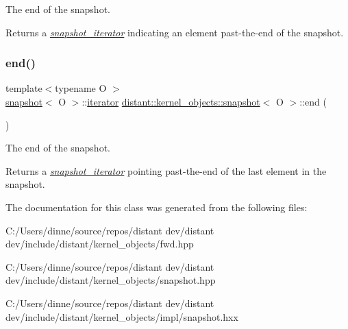 The end of the snapshot. 

\begin{DoxyReturn}{Returns}
a {\itshape \mbox{\hyperlink{classdistant_1_1kernel__objects_1_1snapshot__iterator}{snapshot\+\_\+iterator}}} indicating an element past-\/the-\/end of the snapshot. 
\end{DoxyReturn}
\mbox{\label{classdistant_1_1kernel__objects_1_1snapshot_a0ab636ba02b2ec13644a02b00317c4bb}} 
\subsubsection{\texorpdfstring{end()}{end()}\hspace{0.1cm}{\footnotesize\ttfamily [2/2]}}
{\footnotesize\ttfamily template$<$typename O $>$ \\
\mbox{\hyperlink{classdistant_1_1kernel__objects_1_1snapshot}{snapshot}}$<$ O $>$\+::\mbox{\hyperlink{classdistant_1_1kernel__objects_1_1snapshot__iterator}{iterator}} \mbox{\hyperlink{classdistant_1_1kernel__objects_1_1snapshot}{distant\+::kernel\+\_\+objects\+::snapshot}}$<$ O $>$\+::end (\begin{DoxyParamCaption}{ }\end{DoxyParamCaption})}



The end of the snapshot. 

\begin{DoxyReturn}{Returns}
a {\itshape \mbox{\hyperlink{classdistant_1_1kernel__objects_1_1snapshot__iterator}{snapshot\+\_\+iterator}}} pointing past-\/the-\/end of the last element in the snapshot. 
\end{DoxyReturn}


The documentation for this class was generated from the following files\+:\begin{DoxyCompactItemize}
\item 
C\+:/\+Users/dinne/source/repos/distant dev/distant dev/include/distant/kernel\+\_\+objects/fwd.\+hpp\item 
C\+:/\+Users/dinne/source/repos/distant dev/distant dev/include/distant/kernel\+\_\+objects/snapshot.\+hpp\item 
C\+:/\+Users/dinne/source/repos/distant dev/distant dev/include/distant/kernel\+\_\+objects/impl/snapshot.\+hxx\end{DoxyCompactItemize}
